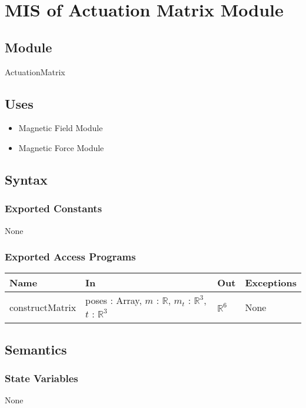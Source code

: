 \documentclass[12pt, titlepage]{article}
\begin{document}
\newpage

\section{MIS of Actuation Matrix Module} \label{MISActMatrix}

\subsection{Module}
ActuationMatrix

\subsection{Uses}
\begin{itemize}
  \item Magnetic Field Module
  \item Magnetic Force Module 
\end{itemize}

\subsection{Syntax}

\subsubsection{Exported Constants}
None

\subsubsection{Exported Access Programs}
\begin{center}
\begin{tabular}{p{3cm} p{4cm} p{4cm} p{3cm}}
\hline
\textbf{Name} & \textbf{In} & \textbf{Out} & \textbf{Exceptions} \\
\hline
constructMatrix & poses : Array, $m$ : $\mathbb{R}$, $m_t$ : $\mathbb{R}^3$, $t$ : $\mathbb{R}^3$  & $\mathbb{R}^6$ & None \\
\hline
\end{tabular}
\end{center}

\subsection{Semantics}

\subsubsection{State Variables}
None
\end{document}
